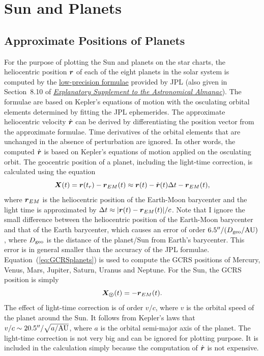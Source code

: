 \documentclass[12pt]{article}
\newcommand \beq {\begin{equation}}
\newcommand \eeq {\end{equation}}
\newcommand{\ve}[1]{\mbox{\boldmath $#1$}}
\newcommand{\expl}{\href{http://www.uscibooks.com/urban.htm}{\it Explanatory Supplement to the Astronomical Almanac}}
\begin{document}
\section{Sun and Planets}

\subsection{Approximate Positions of Planets} 

For the purpose of plotting the Sun and planets on the star charts, the
heliocentric position $\ve{r}$ of each of the eight planets in the solar system 
is computed by the \href{https://ssd.jpl.nasa.gov/?planet_pos}{low-precision formulae} 
provided by JPL (also given in Section~8.10 of \expl). The formulae are based on 
Kepler's equations of motion with the osculating orbital elements determined 
by fitting the JPL ephemerides. The approximate heliocentric 
velocity $\dot{\ve{r}}$ can be derived by differentiating the position 
vector from the approximate formulae. Time derivatives of the orbital elements 
that are unchanged in the absence of perturbation are ignored. In other words, 
the computed $\dot{\ve{r}}$ is based on Kepler's equations of motion applied 
on the osculating orbit.
The geocentric position of a planet, including the light-time correction, is calculated 
using the equation 
\beq
  \ve{X}(t) = \ve{r}(t_r) - \ve{r}_{EM}(t) 
\approx \ve{r}(t) - \dot{\ve{r}}(t) \Delta t - \ve{r}_{EM}(t) ,
\label{eq:GCRSplanets}
\eeq
where $\ve{r}_{EM}$ is the heliocentric position of the 
Earth-Moon barycenter and the light time is approximated by 
$\Delta t \approx |\ve{r}(t) - \ve{r}_{EM}(t)|/c$. 
Note that I ignore the small difference between the heliocentric position of 
the Earth-Moon barycenter and that of the Earth barycenter, which causes 
an error of order $6.5''/(D_{\rm geo}/{\rm AU})$, where $D_{\rm geo}$ is the distance of the 
planet/Sun from Earth's barycenter. This error is in general smaller than the accuracy 
of the JPL formulae. 
Equation~(\ref{eq:GCRSplanets}) is used to compute the GCRS positions 
of Mercury, Venus, Mars, Jupiter, Saturn, Uranus and Neptune. For the Sun, 
the GCRS position is simply 
\beq
  \ve{X_{\odot}}(t) = -\ve{r}_{EM}(t) .
\label{eq:GCRSsun}
\eeq
The effect of light-time correction is of order $v/c$, 
where $v$ is the orbital speed of the planet around the Sun. It follows from 
Kepler's laws that $v/c \sim 20.5''/\sqrt{a/{\rm AU}}$, where $a$ is the orbital 
semi-major axis of the planet. The light-time correction is 
not very big and can be ignored for plotting purpose. It is included 
in the calculation simply because the computation of $\dot{\ve{r}}$ is 
not expensive.
\end{document}
